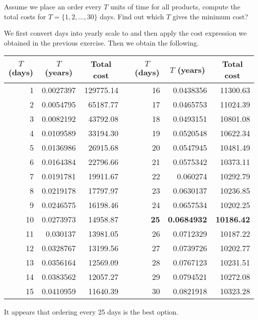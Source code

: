 \begin{exercise}
Assume we place an order every $T$ units of time for all products, compute the total costs for $T=\{1,2,\ldots,30\}$ days. Find out which $T$ gives the minimum cost?


\begin{solution}
We first convert days into yearly scale to and then apply the cost expression we obtained in the previous exercise. Then we obtain the following.

\begin{center}
    \begin{tabular}{r|rrrr|rr}
    \multicolumn{1}{c}{$T$ (days)} & \multicolumn{1}{c}{$T$ (years)} & \multicolumn{1}{c}{Total cost} &       & \multicolumn{1}{c}{$T$ (days)} & \multicolumn{1}{c}{$T$ (years)} & \multicolumn{1}{c}{Total cost} \\
    \toprule
    1     & 0.0027397 & 129775.14 &       & 16    & 0.0438356 & 11300.63 \\
    2     & 0.0054795 & 65187.77 &       & 17    & 0.0465753 & 11024.39 \\
    3     & 0.0082192 & 43792.08 &       & 18    & 0.0493151 & 10801.08 \\
    4     & 0.0109589 & 33194.30 &       & 19    & 0.0520548 & 10622.34 \\
    5     & 0.0136986 & 26915.68 &       & 20    & 0.0547945 & 10481.49 \\
    6     & 0.0164384 & 22796.66 &       & 21    & 0.0575342 & 10373.11 \\
    7     & 0.0191781 & 19911.67 &       & 22    & 0.060274 & 10292.79 \\
    8     & 0.0219178 & 17797.97 &       & 23    & 0.0630137 & 10236.85 \\
    9     & 0.0246575 & 16198.46 &       & 24    & 0.0657534 & 10202.25 \\
    10    & 0.0273973 & 14958.87 &       & \textbf{25}    & \textbf{0.0684932} & \textbf{10186.42} \\
    11    & 0.030137 & 13981.05 &       & 26    & 0.0712329 & 10187.22 \\
    12    & 0.0328767 & 13199.56 &       & 27    & 0.0739726 & 10202.77 \\
    13    & 0.0356164 & 12569.09 &       & 28    & 0.0767123 & 10231.51 \\
    14    & 0.0383562 & 12057.27 &       & 29    & 0.0794521 & 10272.08 \\
    15    & 0.0410959 & 11640.39 &       & 30    & 0.0821918 & 10323.28 \\
    \bottomrule
    \end{tabular}%
\end{center}

It appears that ordering every 25 days is the best option.
\end{solution}
\end{exercise}


